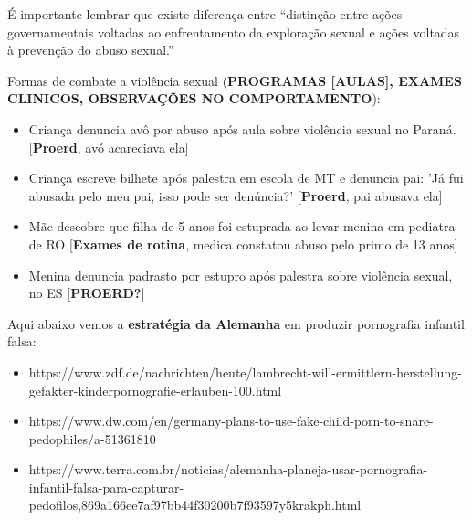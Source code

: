 É importante lembrar que existe diferença entre ``distinção entre ações governamentais voltadas ao enfrentamento da exploração sexual e ações voltadas à prevenção do abuso sexual.''  \cite{caccia2014conselheiros}

Formas de combate a violência sexual (\textbf{PROGRAMAS [AULAS], EXAMES CLINICOS, OBSERVAÇÕES NO COMPORTAMENTO}):

\begin{itemize}
  \item Criança denuncia avô por abuso após aula sobre violência sexual no Paraná. \cite{central2019crianca} [\textbf{Proerd}, avó acareciava ela]
  \item Criança escreve bilhete após palestra em escola de MT e denuncia pai: 'Já fui abusada pelo meu pai, isso pode ser denúncia?' \cite{lidiane2018crianca} [\textbf{Proerd}, pai abusava ela]
  \item Mãe descobre que filha de 5 anos foi estuprada ao levar menina em pediatra de RO \cite{jonatas2018crianca} [\textbf{Exames de rotina}, medica constatou abuso pelo primo de 13 anos]
  \item Menina denuncia padrasto por estupro após palestra sobre violência sexual, no ES [\textbf{PROERD?}]
\end{itemize}


Aqui abaixo vemos a \textbf{estratégia da Alemanha} em produzir pornografia infantil falsa:
\begin{itemize}
  \item https://www.zdf.de/nachrichten/heute/lambrecht-will-ermittlern-herstellung-gefakter-kinderpornografie-erlauben-100.html

  \item https://www.dw.com/en/germany-plans-to-use-fake-child-porn-to-snare-pedophiles/a-51361810

  \item https://www.terra.com.br/noticias/alemanha-planeja-usar-pornografia-infantil-falsa-para-capturar-pedofilos,869a166ee7af97bb44f30200b7f93597y5krakph.html
\end{itemize}


